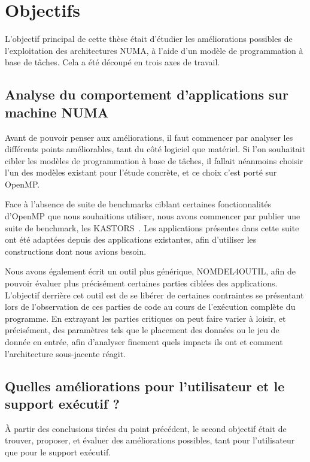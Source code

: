 \section{Objectifs}\label{sec:intro:objectives}

L'objectif principal de cette thèse était d'étudier les améliorations possibles de l'exploitation des architectures NUMA, à l'aide d'un modèle de programmation à base de tâches.
Cela a été découpé en trois axes de travail.


\subsection{Analyse du comportement d'applications sur machine NUMA}

Avant de pouvoir penser aux améliorations, il faut commencer par analyser les différents points améliorables, tant du côté logiciel que matériel.
Si l'on souhaitait cibler les modèles de programmation à base de tâches, il fallait néanmoins choisir l'un des modèles existant pour l'étude concrète, et ce choix c'est porté sur OpenMP.

Face à l'absence de suite de benchmarks ciblant certaines fonctionnalités d'OpenMP que nous souhaitions utiliser, nous avons commencer par publier une suite de benchmark, les KASTORS~\cite{Virouleau2014}.
Les applications présentes dans cette suite ont été adaptées depuis des applications existantes, afin d'utiliser les constructions dont nous avions besoin.

Nous avons également écrit un outil plus générique, NOMDEL4OUTIL, afin de pouvoir évaluer plus précisément certaines parties ciblées des applications.
L'objectif derrière cet outil est de se libérer de certaines contraintes se présentant lors de l'observation de ces parties de code au cours de l'exécution complète du programme.
En extrayant les parties critiques on peut faire varier à loisir, et précisément, des paramètres tels que le placement des données ou le jeu de donnée en entrée, afin d'analyser finement quels impacts ils ont et comment l'architecture sous-jacente réagit.


\subsection{Quelles améliorations pour l'utilisateur et le support exécutif ?}

À partir des conclusions tirées du point précédent, le second objectif était de trouver, proposer, et évaluer des améliorations possibles, tant pour l'utilisateur que pour le support exécutif.

